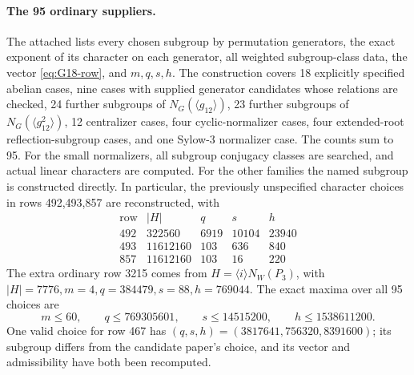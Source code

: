 \paragraph{The 95 ordinary suppliers.}
The attached  lists every chosen
subgroup by permutation generators, the exact exponent of its character
on each generator, all weighted subgroup-class data, the vector
\eqref{eq:G18-row}, and \(m,q,s,h\).
The construction covers 18 explicitly specified abelian cases,
nine cases with supplied generator candidates whose relations are checked,
24 further subgroups of \(N_G(\langle g_{12}\rangle)\),
23 further subgroups of \(N_G(\langle g_{12}^2\rangle)\),
12 centralizer cases, four cyclic-normalizer cases, four extended-root
reflection-subgroup cases, and one Sylow-3 normalizer case.
The counts sum to 95. For the small normalizers, all subgroup conjugacy
classes are searched, and actual linear characters are computed.
For the other families the named subgroup is constructed directly.
In particular, the previously unspecified character choices in rows
492,493,857 are reconstructed, with
\[
\begin{array}{c|r|r|r|r}
\text{row}&|H|&q&s&h\\\hline
492&322560&6919&10104&23940\\
493&11612160&103&636&840\\
857&11612160&103&16&220
\end{array}
\]
The extra ordinary row 3215 comes from
\(H=\langle i\rangle N_W(P_3)\), with
\(|H|=7776,m=4,q=384479,s=88,h=769044\).
The exact maxima over all 95 choices are
\[
 m\le60,\qquad q\le769305601,\qquad
 s\le14515200,\qquad h\le1538611200.
\]
One valid choice for row 467 has
\((q,s,h)=(3817641,756320,8391600)\); its subgroup differs from
the candidate paper's choice, and its vector and admissibility have
both been recomputed.

